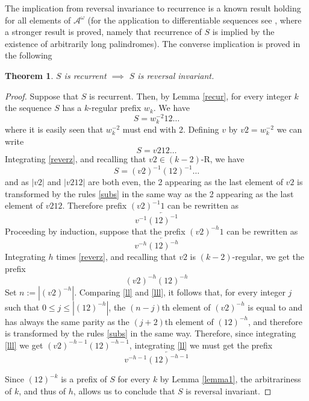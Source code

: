 \documentclass[10pt,a4paper]{article}
\newtheorem{theorem}{Theorem}
\begin{document}
The implication from reversal invariance to recurrence is a known result holding for all elements of $\mathcal{A}^{\omega}$ (for the application to differentiable sequences see \cite{brlek2003note}, where a stronger result is proved, namely that recurrence of $S$ is implied by the existence of arbitrarily long palindromes). The converse implication is proved in the following
\begin{theorem}
$S$ is recurrent $\implies$ $S$ is reversal invariant.
\label{rever}
\end{theorem}
\begin{proof}
Suppose that $S$ is recurrent. Then, by Lemma \ref{recur}, for every integer $k$ the sequence $S$ has a $k$-regular prefix $w_k$. We have
\begin{equation}
S=w_k^{-2}12\dots
\label{revers}
\end{equation}
where it is easily seen that $w_k^{-2}$ must end with 2. Defining $v$ by $v2=w_k^{-2}$ we can write
\begin{equation}
S=v212\dots
\label{reverz}
\end{equation}
Integrating \eqref{reverz}, and recalling that $v2\in (k-2)$-R, we have
\begin{equation}
S=(v2)^{-1}(12)^{-1}\dots
\label{revenj}
\end{equation}
and as $|v2|$ and $|v212|$ are both even, the 2 appearing as the last element of $v2$ is transformed by the rules \eqref{subs} in the same way as the 2 appearing as the last element of $v212$. Therefore prefix $(v2)^{-1}1$ can be rewritten as
\begin{equation*}
v^{-1}\overleftarrow{(12)^{-1}}
\end{equation*}
Proceeding by induction, suppose that the prefix $(v2)^{-h}1$ can be rewritten as 
\begin{equation}
v^{-h}\overleftarrow{(12)^{-h}}
\label{ll}
\end{equation}
Integrating $h$ times \eqref{reverz}, and recalling that $v2$ is $(k-2)$-regular, we get the prefix 
\begin{equation}
(v2)^{-h}(12)^{-h}
\label{lll}
\end{equation}
Set $n:=|(v2)^{-h}|$. Comparing \eqref{ll} and \eqref{lll}, it follows that, for every integer $j$ such that $0\le j\le |(12)^{-h}|$, the $(n-j)$th element of $(v2)^{-h}$ is equal to and has always the same parity as the $(j+2)$th element of $(12)^{-h}$, and therefore is transformed by the rules \eqref{subs} in the same way. Therefore, since integrating \eqref{lll} we get $(v2)^{-h-1}(12)^{-h-1}$, integrating \eqref{ll} we must get the prefix
\begin{equation}
v^{-h-1}\overleftarrow{(12)^{-h-1}}
\label{llll}
\end{equation}

Since $(12)^{-k}$ is a prefix of $S$ for every $k$ by Lemma \ref{lemma1}, the arbitrariness of $k$, and thus of $h$, allows us to conclude that $S$ is reversal invariant.
\end{proof} 
\end{document}
